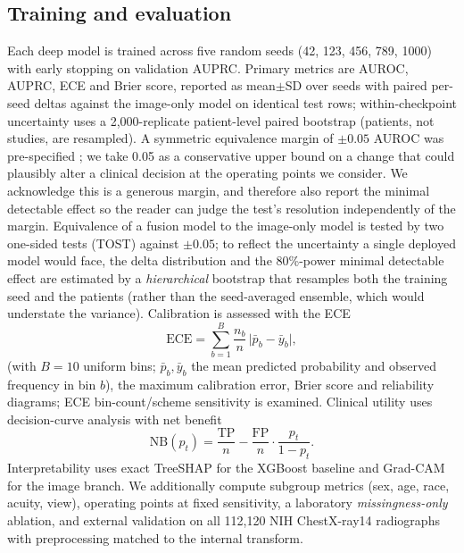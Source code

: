 \documentclass[twocolumn, final]{svjour3}
\begin{document}
\subsection{Training and evaluation}
\label{subsec:eval}
Each deep model is trained across five random seeds (42, 123, 456, 789, 1000) with early
stopping on validation AUPRC. Primary metrics are AUROC, AUPRC, ECE and Brier score,
reported as mean$\pm$SD over seeds with paired per-seed deltas against the image-only
model on identical test rows; within-checkpoint uncertainty uses a 2{,}000-replicate
patient-level paired bootstrap (patients, not studies, are resampled). A symmetric
equivalence margin of $\pm0.05$ AUROC was pre-specified
\citep{piaggio2012noninferiority,lakens2017equivalence}; we take 0.05 as a conservative
upper bound on a change that could plausibly alter a clinical decision at the operating
points we consider. We acknowledge this is a generous margin, and therefore also report
the minimal detectable effect so the reader can judge the test's resolution independently
of the margin. Equivalence of a fusion model to the image-only model is tested by two
one-sided tests (TOST) against $\pm0.05$; to reflect the uncertainty a single deployed
model would face, the delta distribution and the 80\%-power minimal detectable effect are
estimated by a \emph{hierarchical} bootstrap that resamples both the training seed and the
patients (rather than the seed-averaged ensemble, which would understate the variance). Calibration is assessed with the ECE
\begin{equation}
\text{ECE} = \sum_{b=1}^{B}\frac{n_b}{n}\,\bigl|\bar p_b - \bar y_b\bigr|,
\label{eq:ece}
\end{equation}
(with $B{=}10$ uniform bins; $\bar p_b, \bar y_b$ the mean predicted probability and
observed frequency in bin $b$), the maximum calibration error, Brier score and
reliability diagrams; ECE bin-count/scheme sensitivity is examined. Clinical utility
uses decision-curve analysis with net benefit
\begin{equation}
\text{NB}(p_t) = \frac{\text{TP}}{n} - \frac{\text{FP}}{n}\cdot\frac{p_t}{1-p_t}.
\label{eq:nb}
\end{equation}
Interpretability uses exact TreeSHAP \citep{chen2016xgboost} for the XGBoost baseline
and Grad-CAM for the image branch. We additionally compute subgroup metrics (sex,
age, race, acuity, view), operating points at fixed sensitivity, a laboratory
\emph{missingness-only} ablation, and external validation on all 112{,}120 NIH
ChestX-ray14 radiographs \citep{wang2017chestxray} with preprocessing matched to the
internal transform.
\end{document}
